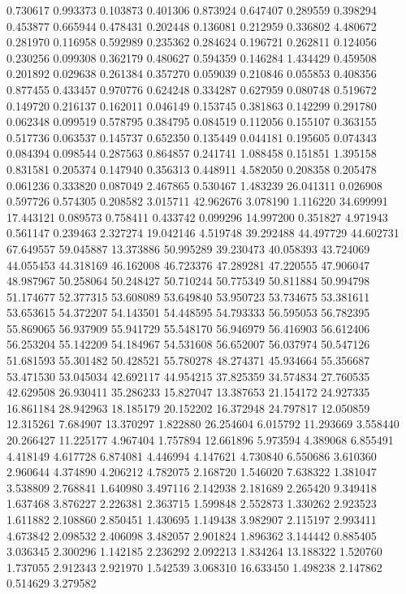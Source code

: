 0.730617
0.993373
0.103873
0.401306
0.873924
0.647407
0.289559
0.398294
0.453877
0.665944
0.478431
0.202448
0.136081
0.212959
0.336802
4.480672
0.281970
0.116958
0.592989
0.235362
0.284624
0.196721
0.262811
0.124056
0.230256
0.099308
0.362179
0.480627
0.594359
0.146284
1.434429
0.459508
0.201892
0.029638
0.261384
0.357270
0.059039
0.210846
0.055853
0.408356
0.877455
0.433457
0.970776
0.624248
0.334287
0.627959
0.080748
0.519672
0.149720
0.216137
0.162011
0.046149
0.153745
0.381863
0.142299
0.291780
0.062348
0.099519
0.578795
0.384795
0.084519
0.112056
0.155107
0.363155
0.517736
0.063537
0.145737
0.652350
0.135449
0.044181
0.195605
0.074343
0.084394
0.098544
0.287563
0.864857
0.241741
1.088458
0.151851
1.395158
0.831581
0.205374
0.147940
0.356313
0.448911
4.582050
0.208358
0.205478
0.061236
0.333820
0.087049
2.467865
0.530467
1.483239
26.041311
0.026908
0.597726
0.574305
0.208582
3.015711
42.962676
3.078190
1.116220
34.699991
17.443121
0.089573
0.758411
0.433742
0.099296
14.997200
0.351827
4.971943
0.561147
0.239463
2.327274
19.042146
4.519748
39.292488
44.497729
44.602731
67.649557
59.045887
13.373886
50.995289
39.230473
40.058393
43.724069
44.055453
44.318169
46.162008
46.723376
47.289281
47.220555
47.906047
48.987967
50.258064
50.248427
50.710244
50.775349
50.811884
50.994798
51.174677
52.377315
53.608089
53.649840
53.950723
53.734675
53.381611
53.653615
54.372207
54.143501
54.448595
54.793333
56.595053
56.782395
55.869065
56.937909
55.941729
55.548170
56.946979
56.416903
56.612406
56.253204
55.142209
54.184967
54.531608
56.652007
56.037974
50.547126
51.681593
55.301482
50.428521
55.780278
48.274371
45.934664
55.356687
53.471530
53.045034
42.692117
44.954215
37.825359
34.574834
27.760535
42.629508
26.930411
35.286233
15.827047
13.387653
21.154172
24.927335
16.861184
28.942963
18.185179
20.152202
16.372948
24.797817
12.050859
12.315261
7.684907
13.370297
1.822880
26.254604
6.015792
11.293669
3.558440
20.266427
11.225177
4.967404
1.757894
12.661896
5.973594
4.389068
6.855491
4.418149
4.617728
6.874081
4.446994
4.147621
4.730840
6.550686
3.610360
2.960644
4.374890
4.206212
4.782075
2.168720
1.546020
7.638322
1.381047
3.538809
2.768841
1.640980
3.497116
2.142938
2.181689
2.265420
9.349418
1.637468
3.876227
2.226381
2.363715
1.599848
2.552873
1.330262
2.923523
1.611882
2.108860
2.850451
1.430695
1.149438
3.982907
2.115197
2.993411
4.673842
2.098532
2.406098
3.482057
2.901824
1.896362
3.144442
0.885405
3.036345
2.300296
1.142185
2.236292
2.092213
1.834264
13.188322
1.520760
1.737055
2.912343
2.921970
1.542539
3.068310
16.633450
1.498238
2.147862
0.514629
3.279582
